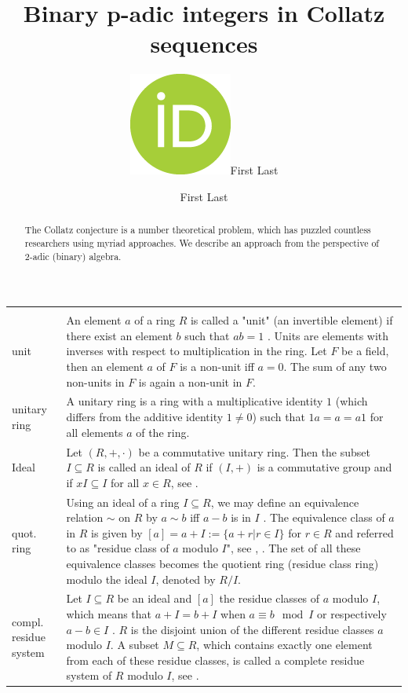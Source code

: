 \documentclass[12pt]{amsart}
\title[Binary p-adic integers in Collatz Sequences]{Binary p-adic integers in Collatz sequences}
\author[F.\ Last1]{\href{https://orcid.org/0000-0000-0000-0000}{\includegraphics[scale=0.06]{orcid.png}}\hspace{1mm}First Last}
\author[F.\ Last2]{First Last}
\theoremstyle{definition}
\begin{document}
	
\begingroup
\let\MakeUppercase\relax
\maketitle
\endgroup

\begin{abstract}
The Collatz conjecture is a number theoretical problem, which has puzzled countless researchers using myriad approaches. We describe an approach from the perspective of 2-adic (binary) algebra.
\end{abstract}

\newpage
{\renewcommand{\arraystretch}{1.8}
\begin{table}[H]
	\centering
	\begin{tabular}{|P{1.4cm} p{13.4cm}|}
		\hline
		\\
		unit & An element $a$ of a ring $R$ is called a "unit" (an invertible element) if there exist an element $b$ such that $ab=1$ \cite[p.~24]{Ref_Northcott_1953}. Units are elements with inverses with respect to multiplication in the ring. Let $F$ be a field, then an element $a$ of $F$ is a non-unit iff $a=0$. The sum of any two non-units in $F$ is again a non-unit in $F$.
		\\
		unitary ring & A unitary ring is a ring with a multiplicative identity $1$ (which differs from the additive identity $1\ne0$) such that $1a=a=a1$ for all elements $a$ of the ring.
		\\
		Ideal & Let $(R,+,\cdot)$ be a commutative unitary ring. Then the subset $I\subseteq R$ is called an ideal of $R$ if $(I,+)$ is a commutative group and if $xI\subseteq I$ for all $x\in R$, see \cite[p.~66-67]{Ref_Wolfart_2011}.
		\\
		quot. ring & Using an ideal of a ring $I\subseteq R$, we may define an equivalence relation $\sim$ on $R$ by $a\sim b$ iff $a-b$ is in $I$ \cite[p.~69]{Ref_Schulze-Pillot_2015}. The equivalence class of $a$ in $R$ is given by $[a]=a+I:=\{a+r|r\in I\}$ for $r\in R$ and referred to as "residue class of $a$ modulo $I$", see \cite[p.~122]{Ref_Schubert_2012}, \cite[p.~70]{Ref_Schulze-Pillot_2015}. The set of all these equivalence classes becomes the quotient ring (residue class ring) modulo the ideal $I$, denoted by $R/I$.
		\\
		compl. residue system & Let $I\subseteq R$ be an ideal and $[a]$ the residue classes of $a$ modulo $I$, which means that $a+I=b+I$ when $a\equiv b\mod I$ or respectively $a-b\in I$ \cite[p.~70]{Ref_Schulze-Pillot_2015}. $R$ is the disjoint union of the different residue classes $a$ modulo $I$. A subset $M\subseteq R$, which contains exactly one element from each of these residue classes, is called a complete residue system of $R$ modulo $I$, see \cite[p.~70]{Ref_Schulze-Pillot_2015}.

\end{tabular}
\end{table}}
\end{document}
